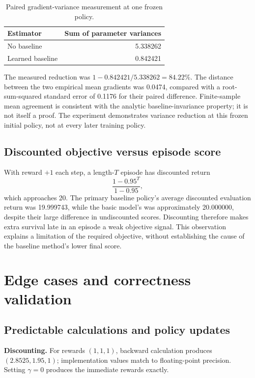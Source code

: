 \documentclass[11pt,letterpaper]{article}
\begin{document}
\begin{table}[!ht]
\centering
\caption{Paired gradient-variance measurement at one frozen policy.}
\begin{tabular}{lr}
\toprule
Estimator & Sum of parameter variances\\
\midrule
No baseline & 5.338262\\
Learned baseline & 0.842421\\
\bottomrule
\end{tabular}
\end{table}

The measured reduction was $1-0.842421/5.338262=84.22\%$. The distance between the two empirical mean gradients was 0.0474, compared with a root-sum-squared standard error of 0.1176 for their paired difference. Finite-sample mean agreement is consistent with the analytic baseline-invariance property; it is not itself a proof. The experiment demonstrates variance reduction at this frozen initial policy, not at every later training policy.

\subsection{Discounted objective versus episode score}
With reward $+1$ each step, a length-$T$ episode has discounted return
\begin{equation}
\frac{1-0.95^T}{1-0.95},
\end{equation}
which approaches 20. The primary baseline policy's average discounted evaluation return was 19.999743, while the basic model's was approximately 20.000000, despite their large difference in undiscounted scores. Discounting therefore makes extra survival late in an episode a weak objective signal. This observation explains a limitation of the required objective, without establishing the cause of the baseline method's lower final score.

\clearpage
\section{Edge cases and correctness validation}
\subsection{Predictable calculations and policy updates}
\textbf{Discounting.} For rewards $(1,1,1)$, backward calculation produces $(2.8525,1.95,1)$; implementation values match to floating-point precision. Setting $\gamma=0$ produces the immediate rewards exactly.
\end{document}
